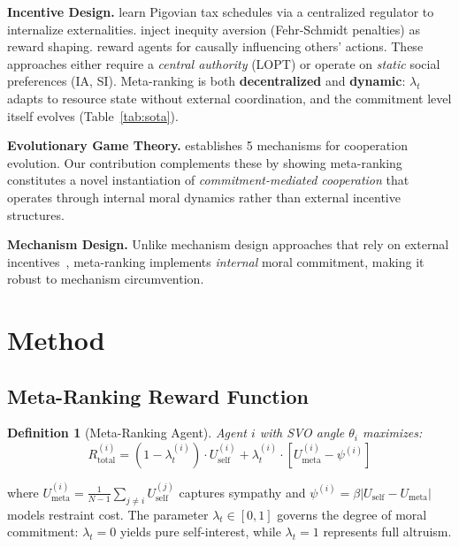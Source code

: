 \documentclass{article}
\newtheorem{definition}{Definition}
\begin{document}
\textbf{Incentive Design.}
\citet{yang2023lopt} learn Pigovian tax schedules via a centralized regulator to internalize externalities.
\citet{hughes2018inequity} inject inequity aversion (Fehr-Schmidt penalties) as reward shaping.
\citet{jaques2019social} reward agents for causally influencing others' actions.
These approaches either require a \textit{central authority} (LOPT) or operate on \textit{static} social preferences (IA, SI).
Meta-ranking is both \textbf{decentralized} and \textbf{dynamic}: $\lambda_t$ adapts to resource state without external coordination, and the commitment level itself evolves (Table~\ref{tab:sota}).

\textbf{Evolutionary Game Theory.}
\citet{nowak2006evolutionary} establishes 5 mechanisms for cooperation evolution.
Our contribution complements these by showing meta-ranking constitutes a novel instantiation of \textit{commitment-mediated cooperation} that operates through internal moral dynamics rather than external incentive structures.

\textbf{Mechanism Design.}
Unlike mechanism design approaches that rely on external incentives~\citep{hurwicz1973design}, meta-ranking implements \textit{internal} moral commitment, making it robust to mechanism circumvention.

\section{Method}

\subsection{Meta-Ranking Reward Function}

\begin{definition}[Meta-Ranking Agent]
Agent $i$ with SVO angle $\theta_i$ maximizes:
\begin{equation}
R_{\text{total}}^{(i)} = (1 - \lambda_t^{(i)}) \cdot U_{\text{self}}^{(i)}
  + \lambda_t^{(i)} \cdot \left[ U_{\text{meta}}^{(i)} - \psi^{(i)} \right]
\label{eq:reward}
\end{equation}
\end{definition}

\noindent where $U_{\text{meta}}^{(i)} = \frac{1}{N-1}\sum_{j \neq i} U_{\text{self}}^{(j)}$ captures sympathy and $\psi^{(i)} = \beta |U_{\text{self}} - U_{\text{meta}}|$ models restraint cost. The parameter $\lambda_t \in [0,1]$ governs the degree of moral commitment: $\lambda_t = 0$ yields pure self-interest, while $\lambda_t = 1$ represents full altruism.
\end{document}
